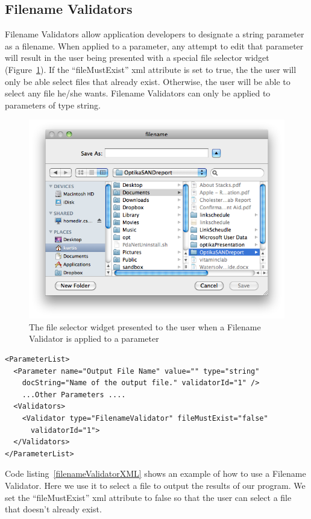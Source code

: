 \subsection{Filename Validators}
Filename Validators allow application developers to designate a string parameter as a filename. When applied to a parameter,
any attempt to edit that parameter will result in the user being presented with a special file selector widget (Figure~\ref{fileSelectorWidget}). If the 
``fileMustExist'' xml attribute is set to true, the the user will only be able select files that already exist. Otherwise, the user will be able
to select any file he/she wants. Filename Validators can only be applied to parameters of type string. 
\begin{figure}
\centering
\includegraphics[scale=0.5]{graphics/fileWidget}
\caption{The file selector widget presented to the user when a Filename Validator is applied to a parameter}
\label{fileSelectorWidget}
\end{figure}
\begin{lstlisting}[caption={Example usage of a Filename Validator}, label=filenameValidatorXML]
<ParameterList>
  <Parameter name="Output File Name" value="" type="string" 
    docString="Name of the output file." validatorId="1" />
    ...Other Parameters ....
  <Validators>
    <Validator type="FilenameValidator" fileMustExist="false" 
      validatorId="1">
  </Validators>
</ParameterList>
\end{lstlisting}
Code listing~\ref{filenameValidatorXML} shows an example of how to use a Filename Validator. Here we use it to select a file to output the results
of our program. We set the ``fileMustExist'' xml attribute to false so that the user can select a file that doesn't already exist.

